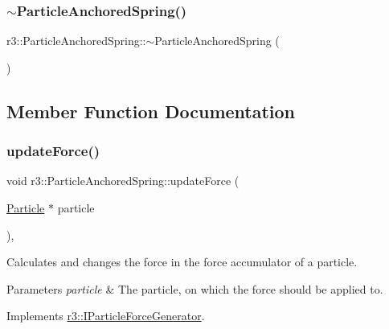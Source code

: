 \subsubsection{\texorpdfstring{$\sim$\+Particle\+Anchored\+Spring()}{~ParticleAnchoredSpring()}}
{\footnotesize\ttfamily r3\+::\+Particle\+Anchored\+Spring\+::$\sim$\+Particle\+Anchored\+Spring (\begin{DoxyParamCaption}{ }\end{DoxyParamCaption})\hspace{0.3cm}{\ttfamily [default]}}



\subsection{Member Function Documentation}
\mbox{\label{classr3_1_1_particle_anchored_spring_a8c5690a32a5061582989d5915a84cff8}} 
\subsubsection{\texorpdfstring{update\+Force()}{updateForce()}}
{\footnotesize\ttfamily void r3\+::\+Particle\+Anchored\+Spring\+::update\+Force (\begin{DoxyParamCaption}\item[{\mbox{\hyperlink{classr3_1_1_particle}{Particle}} $\ast$}]{particle }\end{DoxyParamCaption})\hspace{0.3cm}{\ttfamily [override]}, {\ttfamily [virtual]}}



Calculates and changes the force in the force accumulator of a particle. 


\begin{DoxyParams}{Parameters}
{\em particle} & The particle, on which the force should be applied to. \\
\hline
\end{DoxyParams}


Implements \mbox{\hyperlink{classr3_1_1_i_particle_force_generator_af705063c5d7debca0f7a5c5c68c28f50}{r3\+::\+I\+Particle\+Force\+Generator}}.



